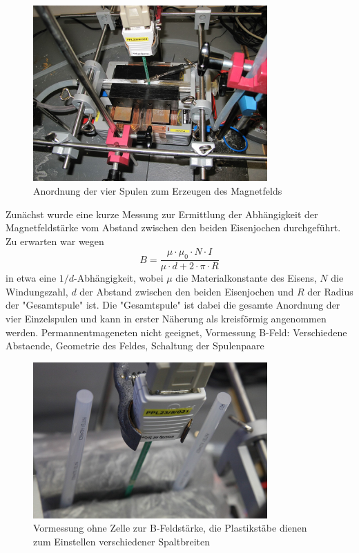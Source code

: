 \documentclass[11pt]{scrartcl}
\begin{document}
\begin{figure}[ht]
\begin{center}
\includegraphics[width=0.8\textwidth]{images/bfeld-vor2.jpg}
\end{center}
\vspace{-1.5\baselineskip}
\caption{Anordnung der vier Spulen zum Erzeugen des Magnetfelds}
\label{bfeld-vor2}
\end{figure}

Zunächst wurde eine kurze Messung zur Ermittlung der Abhängigkeit der Magnetfeldstärke vom Abstand zwischen den beiden Eisenjochen
durchgeführt. Zu erwarten war wegen 
\begin{equation*}
B = \frac{\mu \cdot \mu_{0} \cdot N \cdot I}{\mu \cdot d + 2 \cdot \pi \cdot R}
\end{equation*}
in etwa eine $1/d$-Abhängigkeit, wobei $\mu$ die Materialkonstante des Eisens, $N$ die Windungszahl, $d$ der Abstand zwischen den beiden Eisenjochen und $R$ der Radius der "Gesamtspule" ist. Die "Gesamtspule" ist dabei die gesamte Anordnung der vier Einzelspulen und kann in erster Näherung als kreisförmig angenommen werden.
Permannentmageneten nicht geeignet, Vormessung B-Feld: Verschiedene Abstaende, Geometrie des Feldes, Schaltung der Spulenpaare

\begin{figure}[ht]
\begin{center}
\includegraphics[width=0.8\textwidth]{images/bfeld-vor1.jpg}
\end{center}
\vspace{-1.5\baselineskip}
\caption{Vormessung ohne Zelle zur B-Feldst\"arke, die Plastikst\"abe dienen zum Einstellen verschiedener Spaltbreiten}
\label{bfeld-vor1}
\end{figure}
\end{document}
